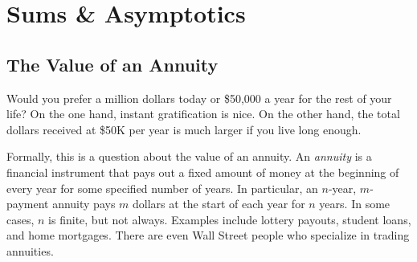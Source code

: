 \chapter{Sums \& Asymptotics}\label{asymptotics_chap}

\section{The Value of an Annuity}\label{annuity_sec}

Would you prefer a million dollars today or \$50,000 a year for the
rest of your life?  On the one hand, instant gratification is nice.
On the other hand, the total dollars received at \$50K per year is
much larger if you live long enough.

Formally, this is a question about the value of an annuity.
An {\em annuity} is a financial instrument that pays out a fixed
amount of money at the beginning of every year for some specified
number of years.  In particular, an $n$-year, $m$-payment annuity pays
$m$ dollars at the start of each year for $n$ years.  In some cases,
$n$ is finite, but not always.  Examples include lottery payouts,
student loans, and home mortgages.  There are even Wall Street people
who specialize in trading annuities.

